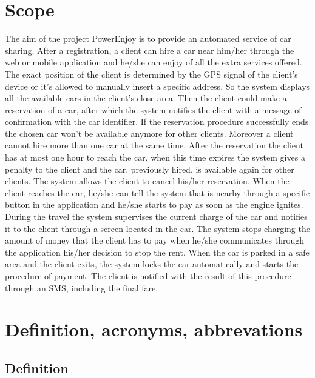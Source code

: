 \section{Scope}
The aim of the project PowerEnjoy is to provide an automated service of car sharing.
After a registration, a client can hire a car near him/her through the web or mobile application and he/she can enjoy of all the extra services offered.
The exact position of the client is determined by the GPS signal of the client’s device or it’s allowed to manually insert a specific address.
So the system displays all the available cars in the client’s close area.
Then the client could make a reservation of a car, after which the system notifies the client with a message of confirmation with the car identifier.
If the reservation procedure successfully ends the chosen car won’t be available anymore for other clients.
Moreover a client cannot hire more than one car at the same time.
After the reservation the client has at most one hour to reach the car, when this time expires the system gives a penalty to the client and the car, previously hired, is available again for other clients.
The system allows the client to cancel his/her reservation.
When the client reaches the car, he/she can tell the system that is nearby through a specific button in the application and he/she starts to pay as soon as the engine ignites.
During the travel the system supervises the current charge of the car and notifies it to the client through a screen located in the car.
The system stops charging the amount of money that the client has to pay when he/she communicates through the application his/her decision to stop the rent.
When the car is parked in a safe area and the client exits, the system locks the car automatically and starts the procedure of payment.
The client is notified with the result of this procedure through an SMS, including the final fare.


\section{Definition, acronyms, abbrevations}

\subsection{Definition}

